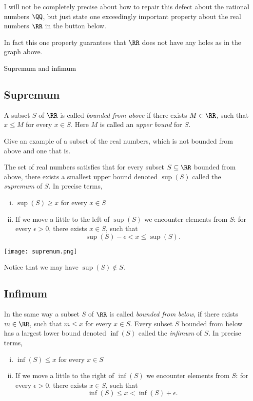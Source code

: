 \documentclass{article}
\begin{document}
I will not be completely precise about how to repair this defect about the
rational numbers $\QQ$, but
just state one exceedingly important property about the real numbers $\RR$ in
the button below.

In fact this
one property guarantees that $\RR$ does not have any holes
as in the graph above.


\begin{hideinbutton}{Supremum and infimum}
\subsection{Supremum}

A subset $S$ of $\RR$ is called \emph{bounded from above} if there exists
$M\in \RR$, such that $x\leq M$ for every $x\in S$. Here $M$ is
called an \emph{upper bound} for $S$.

\beginshex
Give an example of a subset of the real numbers, which is not bounded from
above and one that is.
\endshex


The set of real numbers satisfies that for every subset $S\subseteq \RR$ bounded from above,
 there exists a smallest upper bound denoted $\sup(S)$ called
the \emph{supremum} of $S$. In precise terms,
\begin{enumerate}[(i)]
\item
  $\sup(S)\geq x$ for every $x\in S$ 
\item
  If we move a little to the left of $\sup(S)$ we encounter
  elements from $S$: for every $\epsilon > 0$, there exists $x\in S$,
  such that
  $$
  \sup(S)-\epsilon < x \leq \sup(S).
  $$
\end{enumerate}

\texttt{[image: supremum.png]}

Notice that we may have $\sup(S)\not\in S$.

\subsection{Infimum}

In the same way a subset $S$ of $\RR$ is called \emph{bounded from below}, if
there exists $m\in \RR$, such that $m \leq x$ for
every $x\in S$. Every subset $S$ bounded from below has
a largest lower bound denoted $\inf(S)$ called the \emph{infimum} of $S$.
In precise terms,
\begin{enumerate}[(i)]
\item
  $\inf(S)\leq x$ for every $x\in S$ 
\item
  If we move a little to the right of $\inf(S)$ we encounter
  elements from $S$: for every $\epsilon > 0$, there exists $x\in S$,
  such that
  $$
  \inf(S) \leq x < \inf(S) + \epsilon.
  $$
\end{enumerate}



\end{hideinbutton}
\end{document}
